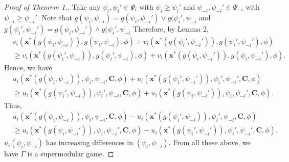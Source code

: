 \documentclass[12pt]{article}
\theoremstyle{definition}
\newcommand{\bm}[1]{\boldsymbol{#1}}
\begin{document}
\begin{proof}[Proof of Theorem 1.]
	Take any $\psi_i, \psi_i' \in \Psi_i$ with $\psi_i \ge \psi_i'$ and $\psi_{-i}, \psi_{-i}' \in \Psi_{-i}$ with $\psi_{-i} \ge \psi_{-i}'$.
	Note that $g(\psi_i, \psi_{-i}) = g(\psi_i, \psi_{-i}') \vee g(\psi_i', \psi_{-i}$ and $g(\psi_i', \psi_{-i}') = g(\psi_i, \psi_{-i}') \wedge g(\psi_i', \psi_{-i}$
	Therefore, by Lemma 2,
	\begin{align*}
		& v_i(\bm{x}^*(g(\psi_i, \psi_{-i})), g(\psi_i, \psi_{-i}), \phi) + v_i(\bm{x}^*(g(\psi_i', \psi_{-i}')), g(\psi_i', \psi_{-i}'),\phi) \\
			& \ge v_i(\bm{x}^*(g(\psi_i', \psi_{-i})), g(\psi_i', \psi_{-i}), \phi) + v_i(\bm{x}^*(g(\psi_i, \psi_{-i}')), g(\psi_i, \psi_{-i}'),\phi).
	\end{align*}
	Hence, we have
	\begin{align*}
		& u_i(\bm{x}^*(g(\psi_i, \psi_{-i})), \psi_i, \psi_{-i}, \bm{C}, \phi) + u_i(\bm{x}^*(g(\psi_i', \psi_{-i}')), \psi_i', \psi_{-i}', \bm{C}, \phi) \\
			& \ge u_i(\bm{x}^*(g(\psi_i', \psi_{-i})), \psi_i', \psi_{-i}, \bm{C}, \phi) + u_i(\bm{x}^*(g(\psi_i, \psi_{-i}')), \psi_i, \psi_{-i}', \bm{C}, \phi).
	\end{align*}
	Thus,
	\begin{align*}
		& u_i(\bm{x}^*(g(\psi_i, \psi_{-i})), \psi_i, \psi_{-i}, \bm{C}, \phi) - u_i(\bm{x}^*(g(\psi_i', \psi_{-i})), \psi_i', \psi_{-i}, \bm{C}, \phi) \\
			& \ge u_i(\bm{x}^*(g(\psi_i, \psi_{-i}')), \psi_i, \psi_{-i}', \bm{C}, \phi) - u_i(\bm{x}^*(g(\psi_i', \psi_{-i}')), \psi_i', \psi_{-i}', \bm{C}, \phi).
	\end{align*}
	$u_i(\psi_i, \psi_{-i})$ has increasing differences in $(\psi_i, \psi_{-i})$.
	From all these above, we have $\Gamma$ is a supermodular game.
\end{proof}
\end{document}
